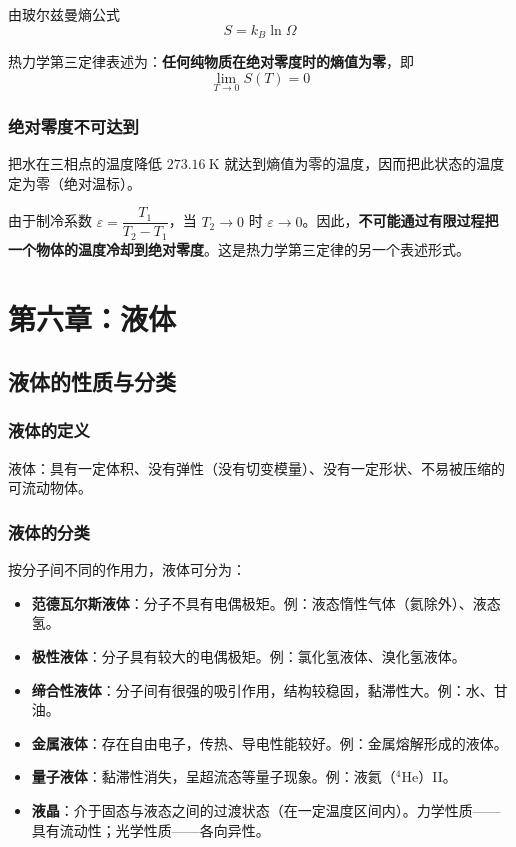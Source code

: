 \documentclass[UTF8]{ctexart}
\begin{document}
由玻尔兹曼熵公式
\[
S=k_B\ln\Omega
\]

热力学第三定律表述为：\textbf{任何纯物质在绝对零度时的熵值为零}，即
\[
\boxed{\lim_{T\to 0}S(T)=0}
\]

\subsubsection{绝对零度不可达到}

把水在三相点的温度降低 $273.16\ \mathrm{K}$ 就达到熵值为零的温度，因而把此状态的温度定为零（绝对温标）。

由于制冷系数 $\varepsilon=\dfrac{T_1}{T_2-T_1}$，当 $T_2\to 0$ 时 $\varepsilon\to 0$。因此，\textbf{不可能通过有限过程把一个物体的温度冷却到绝对零度}。这是热力学第三定律的另一个表述形式。

\newpage
\section{第六章：液体}

\subsection{液体的性质与分类}

\subsubsection{液体的定义}

液体：具有一定体积、没有弹性（没有切变模量）、没有一定形状、不易被压缩的可流动物体。

\subsubsection{液体的分类}

按分子间不同的作用力，液体可分为：

\begin{itemize}[leftmargin=2em]
  \item \textbf{范德瓦尔斯液体}：分子不具有电偶极矩。例：液态惰性气体（氦除外）、液态氢。
  \item \textbf{极性液体}：分子具有较大的电偶极矩。例：氯化氢液体、溴化氢液体。
  \item \textbf{缔合性液体}：分子间有很强的吸引作用，结构较稳固，黏滞性大。例：水、甘油。
  \item \textbf{金属液体}：存在自由电子，传热、导电性能较好。例：金属熔解形成的液体。
  \item \textbf{量子液体}：黏滞性消失，呈超流态等量子现象。例：液氦（$^4\mathrm{He}$）II。
  \item \textbf{液晶}：介于固态与液态之间的过渡状态（在一定温度区间内）。力学性质——具有流动性；光学性质——各向异性。
\end{itemize}
\end{document}
